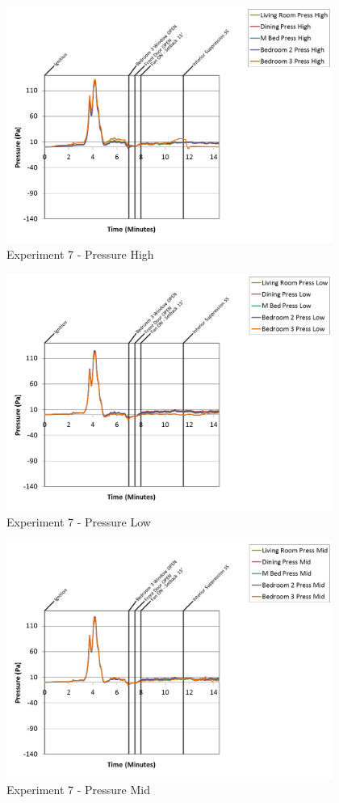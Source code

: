 \documentclass{article}
\begin{document}
\begin{appendices}
\clearpage

\begin{figure}[h!]
	\centering
	\includegraphics[height=3.05in]{0_Images/Results_Charts/Exp_7_Charts/PressureHigh.png}
	\caption{Experiment 7 - Pressure High}
\end{figure}


\begin{figure}[h!]
	\centering
	\includegraphics[height=3.05in]{0_Images/Results_Charts/Exp_7_Charts/PressureLow.png}
	\caption{Experiment 7 - Pressure Low}
\end{figure}

\clearpage

\begin{figure}[h!]
	\centering
	\includegraphics[height=3.05in]{0_Images/Results_Charts/Exp_7_Charts/PressureMid.png}
	\caption{Experiment 7 - Pressure Mid}
\end{figure}



\end{appendices}
\end{document}
